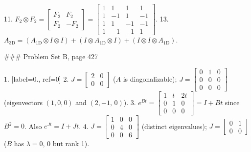 11. \(F_{2}\otimes F_{2}=\begin{bmatrix}F_{2}&F_{2}\\ F_{2}&-F_{2}\end{bmatrix}=\begin{bmatrix}1&1&1&1\\ 1&-1&1&-1\\ 1&1&-1&-1\\ 1&-1&-1&1\end{bmatrix}\).
13. \(A_{\text{3D}}=(A_{\text{1D}}\otimes I\otimes I)+(I\otimes A_{\text{1D}}\otimes I )+(I\otimes I\otimes A_{\text{1D}})\).

### Problem Set B, page 427

1. [label=0., ref=0]
2. \(J=\begin{bmatrix}2&0\\ 0&0\end{bmatrix}\) (\(A\) is diagonalizable); \(J=\begin{bmatrix}0&1&0\\ 0&0&0\\ 0&0&0\end{bmatrix}\) (eigenvectors \((1,0,0)\) and \((2,-1,\,0)\)).
3. \(e^{Bt}=\begin{bmatrix}1&t&2t\\ 0&1&0\\ 0&0&0\end{bmatrix}=I+Bt\) since \(B^{2}=0\). Also \(e^{Jt}=I+Jt\).
4. \(J=\begin{bmatrix}1&0&0\\ 0&4&0\\ 0&0&6\end{bmatrix}\) (distinct eigenvalues); \(J=\begin{bmatrix}0&1\\ 0&0\end{bmatrix}\) (\(B\) has \(\lambda=0\), \(0\) but rank 1).

 